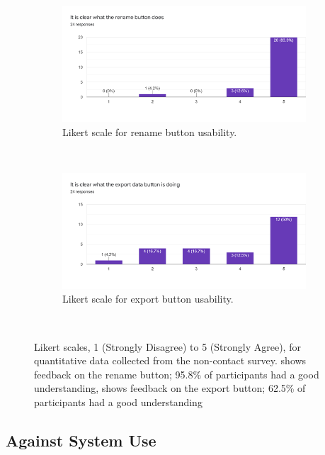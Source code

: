 \documentclass{l4proj}
\begin{document}
\begin{figure}[!htb]
    \centering
    \begin{subfigure}[b]{0.48\textwidth}
        \includegraphics[width=\textwidth]{images/rename_likert.png}
        \caption{ Likert scale for rename button usability. }
        \label{fig:rename_likert}
    \end{subfigure}
    ~
    \begin{subfigure}[b]{0.48\textwidth}
        \includegraphics[width=\textwidth]{images/export_likert.png}
        \caption{ Likert scale for export button usability. }
        \label{fig:export_likert}
    \end{subfigure}
    ~
    \caption{ Likert scales, 1 (Strongly Disagree) to 5 (Strongly Agree), for quantitative data collected from the non-contact survey.  shows feedback on the rename button; 95.8\% of participants had a good understanding,  shows feedback on the export button; 62.5\% of participants had a good understanding }
    \label{fig:button_likert}
\end{figure}

\subsection{Against System Use}
\end{document}
